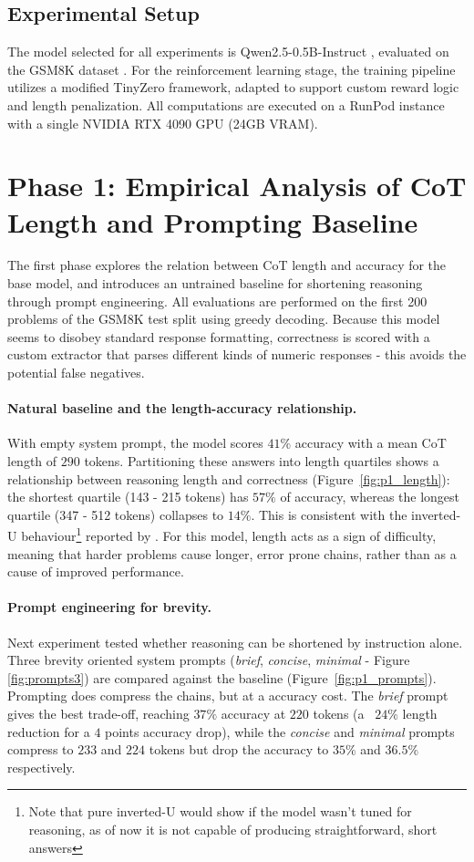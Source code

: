 \documentclass{article}
\begin{document}
\subsection{Experimental Setup}
The model selected for all experiments is Qwen2.5-0.5B-Instruct \cite{qwen2.5_technical_report}, evaluated on the GSM8K dataset \cite{cobbe2021}. For the reinforcement learning stage, the training pipeline utilizes a modified TinyZero \cite{tinyzero} framework, adapted to support custom reward logic and length penalization. All computations are executed on a RunPod instance with a single NVIDIA RTX 4090 GPU (24GB VRAM).

\section{Phase 1: Empirical Analysis of CoT Length and Prompting Baseline}
The first phase explores the relation between CoT length and accuracy for the base model, and introduces an untrained baseline for shortening reasoning through prompt engineering. All evaluations are performed on the first 200 problems of the GSM8K test split using greedy decoding. Because this model seems to disobey standard response formatting, correctness is scored with a custom extractor that parses different kinds of numeric responses - this avoids the potential false negatives.

\paragraph{Natural baseline and the length-accuracy relationship.}
With empty system prompt, the model scores $41\%$ accuracy with a mean CoT length of $290$ tokens. Partitioning these answers into length quartiles shows a relationship between reasoning length and correctness (Figure~\ref{fig:p1_length}): the shortest quartile (143 - 215 tokens) has $57\%$ of accuracy, whereas the longest quartile (347 - 512 tokens) collapses to $14\%$. This is consistent with the inverted-U behaviour\footnote{Note that pure inverted-U would show if the model wasn't tuned for reasoning, as of now it is not capable of producing straightforward, short answers} reported by \cite{wu2025when}. For this model, length acts as a sign of difficulty, meaning that harder problems cause longer, error prone chains, rather than as a cause of improved performance.

\paragraph{Prompt engineering for brevity.}
Next experiment tested whether reasoning can be shortened by instruction alone. Three brevity oriented system prompts (\textit{brief}, \textit{concise}, \textit{minimal} - Figure \ref{fig:prompts3}) are compared against the baseline (Figure~\ref{fig:p1_prompts}). Prompting does compress the chains, but at a accuracy cost. The \textit{brief} prompt gives the best trade-off, reaching $37\%$ accuracy at $220$ tokens (a~ $\!24\%$ length reduction for a $4$ points accuracy drop), while the \textit{concise} and \textit{minimal} prompts compress to $233$ and $224$ tokens but drop the accuracy to $35\%$ and $36.5\%$ respectively.
\end{document}
